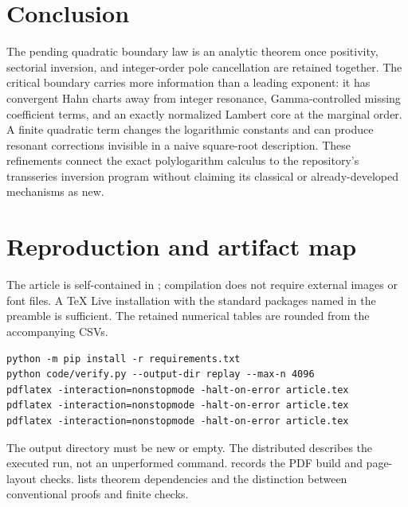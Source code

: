\documentclass[11pt,a4paper]{article}
\theoremstyle{definition}\newtheorem{definition}[theorem]{Definition}
\theoremstyle{remark}\newtheorem{remark}[theorem]{Remark}
\numberwithin{equation}{section}
\begin{document}
\section*{Conclusion}
The pending quadratic boundary law is an analytic theorem once positivity,
sectorial inversion, and integer-order pole cancellation are retained
together. The critical boundary carries more information than a leading
exponent: it has convergent Hahn charts away from integer resonance,
Gamma-controlled missing coefficient terms, and an exactly normalized
Lambert core at the marginal order. A finite quadratic term changes the
logarithmic constants and can produce resonant corrections invisible in a
naive square-root description. These refinements connect the exact
polylogarithm calculus to the repository's transseries inversion program
without claiming its classical or already-developed mechanisms as new.

\clearpage
\appendix
\section{Reproduction and artifact map}\label{qb:app:reproduce}

The article is self-contained in ; compilation does not
require external images or font files. A TeX Live installation with the
standard packages named in the preamble is sufficient. The retained
numerical tables are rounded from the accompanying CSVs.
\begin{verbatim}
python -m pip install -r requirements.txt
python code/verify.py --output-dir replay --max-n 4096
pdflatex -interaction=nonstopmode -halt-on-error article.tex
pdflatex -interaction=nonstopmode -halt-on-error article.tex
pdflatex -interaction=nonstopmode -halt-on-error article.tex
\end{verbatim}
The output directory must be new or empty. The distributed
 describes the executed run, not an
unperformed command.  records the PDF build
and page-layout checks.  lists theorem dependencies
and the distinction between conventional proofs and finite checks.
\end{document}
